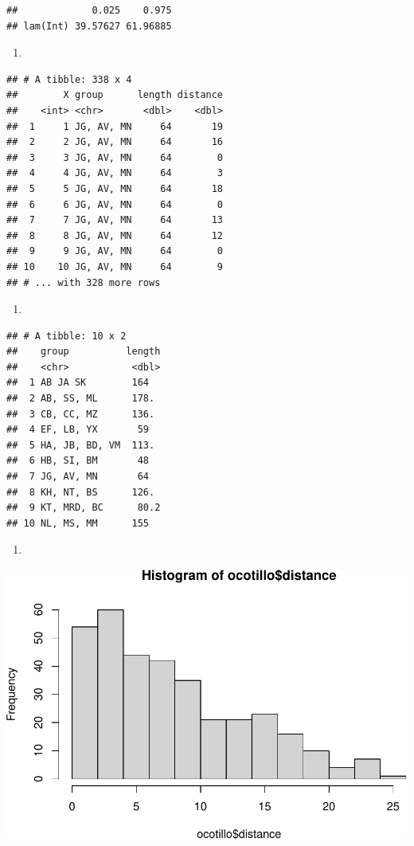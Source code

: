 \documentclass[
]{article}
\providecommand{\tightlist}{%
  \setlength{\itemsep}{0pt}\setlength{\parskip}{0pt}}
\begin{document}
\begin{verbatim}
##             0.025    0.975
## lam(Int) 39.57627 61.96885
\end{verbatim}

\begin{enumerate}
\def\labelenumi{\arabic{enumi}.}
\setcounter{enumi}{14}
\tightlist
\item
\end{enumerate}

\begin{verbatim}
## # A tibble: 338 x 4
##        X group      length distance
##    <int> <chr>       <dbl>    <dbl>
##  1     1 JG, AV, MN     64       19
##  2     2 JG, AV, MN     64       16
##  3     3 JG, AV, MN     64        0
##  4     4 JG, AV, MN     64        3
##  5     5 JG, AV, MN     64       18
##  6     6 JG, AV, MN     64        0
##  7     7 JG, AV, MN     64       13
##  8     8 JG, AV, MN     64       12
##  9     9 JG, AV, MN     64        0
## 10    10 JG, AV, MN     64        9
## # ... with 328 more rows
\end{verbatim}

\begin{enumerate}
\def\labelenumi{\arabic{enumi}.}
\setcounter{enumi}{15}
\tightlist
\item
\end{enumerate}

\begin{verbatim}
## # A tibble: 10 x 2
##    group          length
##    <chr>           <dbl>
##  1 AB JA SK        164  
##  2 AB, SS, ML      178. 
##  3 CB, CC, MZ      136. 
##  4 EF, LB, YX       59  
##  5 HA, JB, BD, VM  113. 
##  6 HB, SI, BM       48  
##  7 JG, AV, MN       64  
##  8 KH, NT, BS      126. 
##  9 KT, MRD, BC      80.2
## 10 NL, MS, MM      155
\end{verbatim}

\begin{enumerate}
\def\labelenumi{\arabic{enumi}.}
\setcounter{enumi}{16}
\tightlist
\item
\end{enumerate}

\includegraphics{Module5_Assignment1_AnswerKey_files/figure-latex/unnamed-chunk-16-1.pdf}
\end{document}
